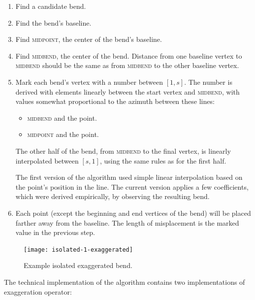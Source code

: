 \documentclass[a4paper]{article}
\begin{document}
\begin{enumerate}
    \item Find a candidate bend.
    \item Find the bend's baseline.
    \item Find \textsc{midpoint}, the center of the bend's baseline.

    \item Find \textsc{midbend}, the center of the bend. Distance from one
        baseline vertex to \textsc{midbend} should be the same as from
        \textsc{midbend} to the other baseline vertex.

    \item Mark each bend's vertex with a number between $[1,s]$. The number is
        derived with elements linearly between the start vertex and
        \textsc{midbend}, with values somewhat proportional to the azimuth
        between these lines:

        \begin{itemize}
            \item \textsc{midbend} and the point.
            \item \textsc{midpoint} and the point.
        \end{itemize}

        The other half of the bend, from \textsc{midbend} to the final vertex,
        is linearly interpolated between $[s,1]$, using the same rules as for
        the first half.

        The first version of the algorithm used simple linear interpolation
        based on the point's position in the line. The current version applies
        a few coefficients, which were derived empirically, by observing the
        resulting bend.

    \item Each point (except the beginning and end vertices of the bend) will
        be placed farther away from the baseline. The length of misplacement is
        the marked value in the previous step.

\end{enumerate}

\begin{figure}[ht]
    \centering
    \texttt{[image: isolated-1-exaggerated]}
    \caption{Example isolated exaggerated bend.}
    \label{fig:isolated-1-exaggerated}
\end{figure}

The technical implementation of the algorithm contains two implementations
of exaggeration operator:
\end{document}
